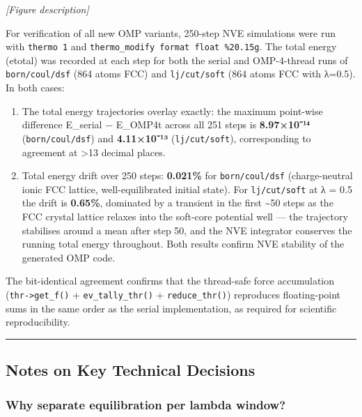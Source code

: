 \documentclass[
  11pt,
]{article}
\providecommand{\tightlist}{%
  \setlength{\itemsep}{0pt}\setlength{\parskip}{0pt}}
\providecommand{\tightlist}{%
  \setlength{\itemsep}{0pt}\setlength{\parskip}{0pt}}
\begin{document}
\emph{{[}Figure description{]}}

For verification of all new OMP variants, 250-step NVE simulations were
run with \texttt{thermo\ 1} and
\texttt{thermo\_modify\ format\ float\ \%20.15g}. The total energy
(etotal) was recorded at each step for both the serial and OMP-4-thread
runs of \texttt{born/coul/dsf} (864 atoms FCC) and \texttt{lj/cut/soft}
(864 atoms FCC with λ=0.5). In both cases:

\begin{enumerate}
\def\labelenumi{\arabic{enumi}.}
\tightlist
\item
  The total energy trajectories overlay exactly: the maximum point-wise
  difference \textbar E\_serial − E\_OMP4t\textbar{} across all 251
  steps is \textbf{8.97×10⁻¹⁴} (\texttt{born/coul/dsf}) and
  \textbf{4.11×10⁻¹³} (\texttt{lj/cut/soft}), corresponding to agreement
  at \textgreater13 decimal places.
\item
  Total energy drift over 250 steps: \textbf{0.021\%} for
  \texttt{born/coul/dsf} (charge-neutral ionic FCC lattice,
  well-equilibrated initial state). For \texttt{lj/cut/soft} at λ = 0.5
  the drift is \textbf{0.65\%}, dominated by a transient in the first
  \textasciitilde50 steps as the FCC crystal lattice relaxes into the
  soft-core potential well --- the trajectory stabilises around a mean
  after step 50, and the NVE integrator conserves the running total
  energy throughout. Both results confirm NVE stability of the generated
  OMP code.
\end{enumerate}

The bit-identical agreement confirms that the thread-safe force
accumulation (\texttt{thr-\textgreater{}get\_f()} +
\texttt{ev\_tally\_thr()} + \texttt{reduce\_thr()}) reproduces
floating-point sums in the same order as the serial implementation, as
required for scientific reproducibility.

\begin{center}\rule{0.5\linewidth}{0.5pt}\end{center}

\subsection{Notes on Key Technical
Decisions}\label{notes-on-key-technical-decisions}

\subsubsection{Why separate equilibration per lambda
window?}\label{why-separate-equilibration-per-lambda-window}
\end{document}
